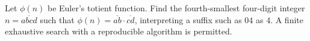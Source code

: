 Let $\phi(n)$ be Euler's totient function. Find the fourth-smallest four-digit integer $n=\overline{abcd}$ such that $\phi(n)=\overline{ab}\cdot\overline{cd}$, interpreting a suffix such as $04$ as $4$. A finite exhaustive search with a reproducible algorithm is permitted.
